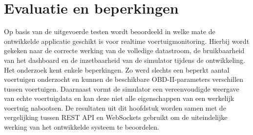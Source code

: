 \section{Evaluatie en beperkingen}
Op basis van de uitgevoerde testen wordt beoordeeld in welke mate de ontwikkelde applicatie geschikt is voor realtime voertuigmonitoring. Hierbij wordt gekeken naar de correcte werking van de volledige datastroom, de bruikbaarheid van het dashboard en de inzetbaarheid van de simulator tijdens de ontwikkeling.
Het onderzoek kent enkele beperkingen. Zo werd slechts een beperkt aantal voertuigen onderzocht en kunnen de beschikbare OBD-II-parameters verschillen tussen voertuigen. Daarnaast vormt de simulator een vereenvoudigde weergave van echte voertuigdata en kan deze niet alle eigenschappen van een werkelijk voertuig nabootsen.
De resultaten uit dit hoofdstuk worden samen met de vergelijking tussen REST API en WebSockets gebruikt om de uiteindelijke werking van het ontwikkelde systeem te beoordelen.
